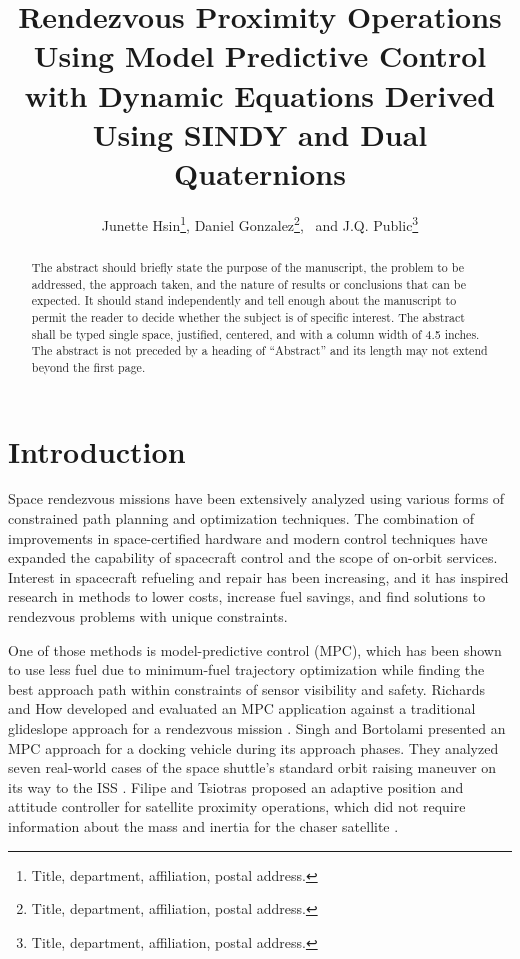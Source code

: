 \documentclass[letterpaper, preprint, paper,11pt]{AAS}	%
\begin{document}
\title{Rendezvous Proximity Operations Using Model Predictive Control with Dynamic Equations Derived Using SINDY and Dual Quaternions}

\author{Junette Hsin\thanks{Title, department, affiliation, postal address.},  
Daniel Gonzalez\thanks{Title, department, affiliation, postal address.},
\ and J.Q. Public\thanks{Title, department, affiliation, postal address.}
}


\maketitle{} 		


\begin{abstract}
	
The abstract should briefly state the purpose of the manuscript, the problem to be addressed, the approach taken, and the nature of results or conclusions that can be expected. It should stand independently and tell enough about the manuscript to permit the reader to decide whether the subject is of specific interest. The abstract shall be typed single space, justified, centered, and with a column width of 4.5 inches. The abstract is not preceded by a heading of ``Abstract'' and its length may not extend beyond the first page.

\end{abstract}








\section{Introduction}
%

Space rendezvous missions have been extensively analyzed using various forms of constrained path planning and optimization techniques. The combination of improvements in space-certified hardware and modern control techniques have expanded the capability of spacecraft control and the scope of on-orbit services. Interest in spacecraft refueling and repair has been increasing, and it has inspired research in methods to lower costs, increase fuel savings, and find solutions to rendezvous problems with unique constraints. 

One of those methods is model-predictive control (MPC), which has been shown to use less fuel due to minimum-fuel trajectory optimization while finding the best approach path within constraints of sensor visibility and safety. Richards and How developed and evaluated an MPC application against a traditional glideslope approach for a rendezvous mission \cite{richards_how_MPC}. Singh and Bortolami presented an MPC approach for a docking vehicle during its approach phases. They analyzed seven real-world cases of the space shuttle's standard orbit raising maneuver on its way to the ISS \cite{}. Filipe and Tsiotras proposed an adaptive position and attitude controller for satellite proximity operations, which did not require information about the mass and inertia for the chaser satellite \cite{}. 
\end{document}
